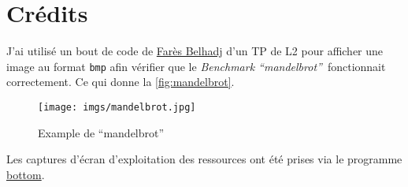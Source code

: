 \documentclass[a4paper]{article}
\def\mandel{\enquote{mandelbrot}}
\def\btwo{\textit{Benchmark \mandel}}
\begin{document}
\clearpage
\appendix
\section{Crédits}

J'ai utilisé un bout de code de \href{https://expreg.org/amsi/C/}{Farès Belhadj}
d'un TP de L2 pour afficher une image au format \texttt{bmp} afin vérifier que
le \btwo~fonctionnait correctement. Ce qui donne la \autoref{fig:mandelbrot}.

\begin{figure}[H]
  \centering
  \texttt{[image: imgs/mandelbrot.jpg]}
  \caption{Example de \mandel}
  \label{fig:mandelbrot}
\end{figure}

Les captures d'écran d'exploitation des ressources ont été prises via le
programme \href{https://github.com/ClementTsang/bottom}{bottom}.
\end{document}

